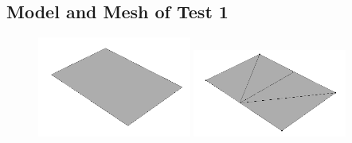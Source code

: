 \documentclass[a4paper, 12pt]{article}
\begin{document}
\subsection{Model and Mesh of Test 1} \label{subsec:test1Img}
\begin{figure}[H]
  \centering
  \subfigure
    { \includegraphics[width=0.45\textwidth, height=0.45\textwidth]{test1_smd}}
  \subfigure
    { \includegraphics[width=0.45\textwidth, height=0.45\textwidth]{test1_sms}}
\end{figure}
\end{document}
